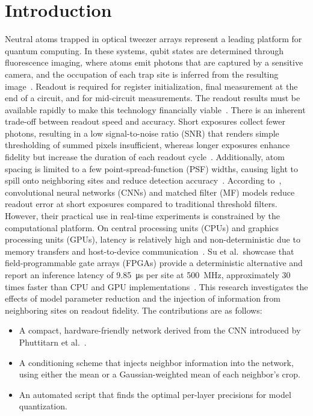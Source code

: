 \section{Introduction}\label{sec:introduction}
Neutral atoms trapped in optical tweezer arrays represent a leading platform for quantum computing. In these systems, qubit states are determined through fluorescence imaging, where atoms emit photons that are captured by a sensitive camera, and the occupation of each trap site is inferred from the resulting image~\cite{winklmann2023,su2026}. Readout is required for register initialization, final measurement at the end of a circuit, and for mid-circuit measurements. The readout results must be available rapidly to make this technology financially viable~\cite{su2026,mude2025}.
There is an inherent trade-off between readout speed and accuracy. Short exposures collect fewer photons, resulting in a low signal-to-noise ratio (SNR) that renders simple thresholding of summed pixels insufficient, whereas longer exposures enhance fidelity but increase the duration of each readout cycle~\cite{su2026,mude2025}. Additionally, atom spacing is limited to a few point-spread-function (PSF) widths, causing light to spill onto neighboring sites and reduce detection accuracy~\cite{impertro2023,phuttitarn2023}.
According to~\cite{phuttitarn2023,kent2025}, convolutional neural networks (CNNs) and matched filter (MF) models reduce readout error at short exposures compared to traditional threshold filters. However, their practical use in real-time experiments is constrained by the computational platform. On central processing units (CPUs) and graphics processing units (GPUs), latency is relatively high and non-deterministic due to memory transfers and host-to-device communication~\cite{su2026}. Su et al.\ showcase that field-programmable gate arrays (FPGAs) provide a deterministic alternative and report an inference latency of \SI{9.85}{\micro\second} per site at \SI{500}{\mega\hertz}, approximately 30 times faster than CPU and GPU implementations~\cite{su2026}.
This research investigates the effects of model parameter reduction and the injection of information from neighboring sites on readout fidelity. The contributions are as follows:
\begin{itemize}
    \item A compact, hardware-friendly network derived from the CNN introduced by Phuttitarn et al.~\cite{phuttitarn2023}.
    \item A conditioning scheme that injects neighbor information into the network, using either the mean or a Gaussian-weighted mean of each neighbor's crop.
    \item An automated script that finds the optimal per-layer precisions for model quantization.
\end{itemize}
